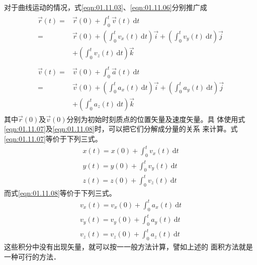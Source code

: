     对于曲线运动的情况，式\eqref{eqn:01.11.03}、\eqref{eqn:01.11.06}分别推广成
{\setlength{\mathindent}{4em}
\setlength\abovedisplayskip{0pt}
\setlength\belowdisplayskip{0pt}
\setlength{\lineskip}{-1pt}
\setlength{\lineskiplimit}{-1pt}
\begin{eqnarray}
    \label{eqn:01.11.07}
    \begin{aligned}
        \vec{r}(t)=& \vec{r}(0)+\int_{0}^{t} \vec{v}(t) {~\mathrm d}  t \\
        =& \vec{r}(0)
        +\left(\int_{0}^{t} v_{x}(t) {~\mathrm d}  t\right) \vec{i}
        +\left(\int_{0}^{t} v_{y}(t) {~\mathrm d}  t\right) \vec{j}  \\
        &+\left(\int_{0}^{t} v_{z}(t) {~\mathrm d}  t\right) \vec{k}
    \end{aligned} \\
    \label{eqn:01.11.08}
    \begin{aligned}
        \vec{v}(t)=& \vec{v}(0)+\int_{0}^{t} \vec{a}(t) {~\mathrm d}  t \\
        =& \vec{v}(0)
        +\left(\int_{0}^{t} a_{x}(t) {~\mathrm d}  t\right) \vec{i}
        +\left(\int_{0}^{t} a_{y}(t) {~\mathrm d}  t\right) \vec{j} \\
        &+\left(\int_{0}^{t} a_{z}(t) {~\mathrm d}  t\right) \vec{k}
    \end{aligned}
\end{eqnarray}
\setlength{\mathindent}{6em}}%
其中$\vec{r}(0)$及$\vec{v}(0)$分别为初始时刻质点的位置矢量及速度矢量。具
体使用式\eqref{eqn:01.11.07}及\eqref{eqn:01.11.08}时，可以把它们分解成分量的关系
来计算。式\eqref{eqn:01.11.07}等价于下列三式。
{\setlength\abovedisplayskip{0pt}
    \setlength\belowdisplayskip{0pt}
    \setlength{\lineskip}{-1pt}
    \setlength{\lineskiplimit}{-1pt}
\begin{equation}
    \begin{aligned}\label{eqn:01.11.09}
        x(t)=x(0)+\int_{0}^{t} v_{x}(t) {~\mathrm d}  t \\
        y(t)=y(0)+\int_{0}^{t} v_{y}(t) {~\mathrm d}  t \\
        z(t)=z(0)+\int_{0}^{t} v_{z}(t) {~\mathrm d}  t
    \end{aligned}
\end{equation}}%
而式\eqref{eqn:01.11.08}等价于下列三式。
{\setlength\abovedisplayskip{0pt}
    \setlength\belowdisplayskip{0pt}
    \setlength{\lineskip}{-1pt}
    \setlength{\lineskiplimit}{-1pt}
\begin{equation}\label{eqn:01.11.10}
    \begin{aligned}
        v_x(t)=v_x(0)+\int_{0}^{t} a_{x}(t) {~\mathrm d}  t \\
        v_y(t)=v_y(0)+\int_{0}^{t} a_{y}(t) {~\mathrm d}  t \\
        v_z(t)=v_z(0)+\int_{0}^{t} a_{z}(t) {~\mathrm d}  t
    \end{aligned}
\end{equation}}%
这些积分中没有出现矢量，就可以按一一般方法计算，譬如上述的
面积方法就是一种可行的方法．

